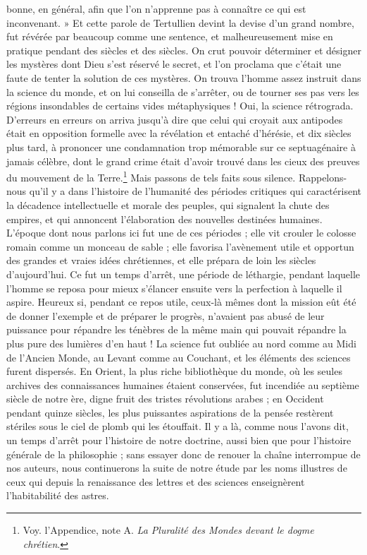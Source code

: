 \documentclass[a4paper, 11pt, oneside, landscape]{article}
\begin{document}
bonne, en général, afin que l'on n'apprenne pas à connaître ce qui est inconvenant. » Et cette parole de Tertullien devint la devise d'un grand nombre, fut révérée par beaucoup comme une sentence, et malheureusement mise en pratique pendant des siècles et des siècles. On crut pouvoir déterminer et désigner les mystères dont Dieu s'est réservé le secret, et l'on proclama que c'était une faute de tenter la solution de ces mystères. On trouva l'homme assez instruit dans la science du monde, et on lui conseilla de s'arrêter, ou de tourner ses pas vers les régions insondables de certains vides métaphysiques ! Oui, la science rétrograda. D'erreurs en erreurs on arriva jusqu'à dire que celui qui croyait aux antipodes était en opposition formelle avec la révélation et entaché d'hérésie, et dix siècles plus tard, à prononcer une condamnation trop mémorable sur ce septuagénaire à jamais célèbre, dont le grand crime était d'avoir trouvé dans les cieux des preuves du mouvement de la Terre.\footnote{Voy. l'Appendice, note A. \emph{La Pluralité des Mondes devant le dogme chrétien}.} Mais passons de tels faits sous silence. Rappelons-nous qu'il y a dans l'histoire de l'humanité des périodes critiques qui caractérisent la décadence intellectuelle et morale des peuples, qui signalent la chute des empires, et qui annoncent l'élaboration des nouvelles destinées humaines. L'époque dont nous parlons ici fut une de ces périodes ; elle vit crouler le colosse romain comme un monceau de sable ; elle favorisa l'avènement utile et opportun des grandes et vraies idées chrétiennes, et elle prépara de loin les siècles d'aujourd'hui. Ce fut un temps d'arrêt, une période de léthargie, pendant laquelle l'homme se reposa pour mieux s'élancer ensuite vers la perfection à laquelle il aspire. Heureux si, pendant ce repos utile, ceux-là mêmes dont la mission eût été de donner l'exemple et de préparer le progrès, n'avaient pas abusé de leur puissance pour répandre les ténèbres de la même main qui pouvait répandre la plus pure des lumières d'en haut ! La science fut oubliée au nord comme au Midi de l'Ancien Monde, au Levant comme au Couchant, et les éléments des sciences furent dispersés. En Orient, la plus riche bibliothèque du monde, où les seules archives des connaissances humaines étaient conservées, fut incendiée au septième siècle de notre ère, digne fruit des tristes révolutions arabes ; en Occident pendant quinze siècles, les plus puissantes aspirations de la pensée restèrent stériles sous le ciel de plomb qui les étouffait. Il y a là, comme nous l'avons dit, un temps d'arrêt pour l'histoire de notre doctrine, aussi bien que pour l'histoire générale de la philosophie ; sans essayer donc de renouer la chaîne interrompue de nos auteurs, nous continuerons la suite de notre étude par les noms illustres de ceux qui depuis la renaissance des lettres et des sciences enseignèrent l'habitabilité des astres.
\clearpage
\end{document}
